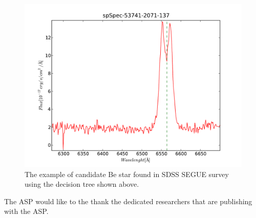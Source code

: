 \documentclass[11pt,twoside]{article}
\begin{document}
\begin{center}
\begin{figure}[!htbp]
  \begin{center}
    \leavevmode
    \includegraphics[scale = .6]{result1}
    \caption{The example of candidate Be star found in SDSS
      SEGUE survey using the decision tree shown above.}
    \label{FigConvolution}
  \end{center}
\end{figure}

\end{center}


%
%



\acknowledgements The ASP would like to the thank the dedicated researchers that are publishing with the ASP.

%
\end{document}
